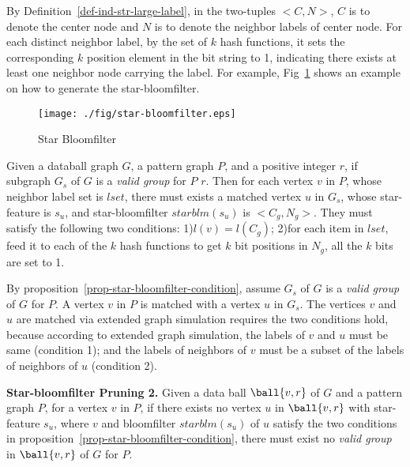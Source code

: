 By Definition~\ref{def-ind-str-large-label}, in the two-tuples $<C,N>$, $C$ is to denote the center node and $N$ is to denote the neighbor labels of center node. For each distinct neighbor label, by the set of $k$ hash functions, it sets the corresponding $k$ position element in the bit string to 1, indicating there exists at least one neighbor node carrying the label. For example, Fig~\ref{fig-bloomfilter-example} shows an example on how to generate the star-bloomfilter.

\begin{figure}[tb!]
\begin{center}
\texttt{[image: ./fig/star-bloomfilter.eps]}
\caption{Star Bloomfilter}
\label{fig-bloomfilter-example}
\end{center}
\end{figure}


\begin{prop}
\label{prop-star-bloomfilter-condition}
Given a databall graph $G$, a pattern graph $P$, and a positive integer $r$, if subgraph $G_{s}$ of $G$ is a {\em valid group} for $P$ \wrt $r$. Then for each vertex $v$ in $P$, whose neighbor label set is $lset$, there must exists a matched vertex $u$ in $G_{s}$, whose star-feature is $s_u$, and star-bloomfilter $starblm(s_u)$ is $<C_g,N_g>$. They must satisfy the following two conditions: 1)$l(v)=l(C_g)$; 2)for each item in $lset$, feed it to each of the $k$ hash functions to get $k$ bit positions in $N_g$, all the $k$ bits are set to 1.
\end{prop}

By proposition~\ref{prop-star-bloomfilter-condition}, assume $G_{s}$ of $G$ is a {\em valid group} of $G$ for $P$. A vertex $v$ in $P$ is matched with a vertex $u$ in $G_{s}$. The vertices $v$ and $u$ are matched via extended graph simulation requires the two conditions hold, because according to extended graph simulation, the labels of $v$ and $u$ must be same (condition 1); and the labels of neighbors of $v$ must be a subset of the labels of neighbors of $u$ (condition 2).

\begin{theorem} {\textbf{Star-bloomfilter Pruning 2.}}
\label{thm-star-bloomfilter-pruning}
Given a data ball $\ball{v, r}$ of $G$ and a pattern graph $P$, for a vertex $v$ in $P$, if there exists no vertex $u$ in $\ball{v, r}$ with star-feature $s_u$, where $v$ and bloomfilter $starblm(s_u)$ of $u$ satisfy the two conditions in proposition~\ref{prop-star-bloomfilter-condition}, there must exist no {\em valid group} in $\ball{v, r}$ of $G$ for $P$.
\end{theorem}

